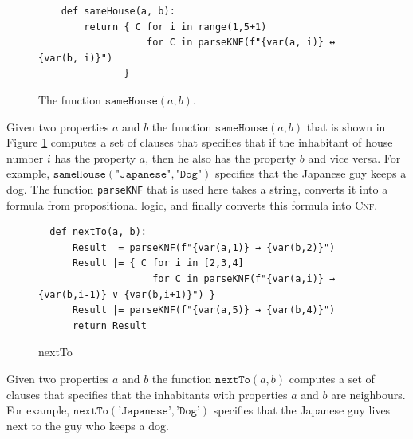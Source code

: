 \begin{figure}[!ht]
\centering
\begin{verbatim}
    def sameHouse(a, b):
        return { C for i in range(1,5+1)
                   for C in parseKNF(f"{var(a, i)} ↔ {var(b, i)}") 
               }
\end{verbatim}
\vspace*{-0.3cm}
\caption{The function $\texttt{sameHouse}(a, b)$.}
\label{fig:sameHouse}
\end{figure}

Given two properties $a$ and $b$ the function $\texttt{sameHouse}(a, b)$ that is
shown in Figure \ref{fig:sameHouse} computes
a set of clauses that specifies that if the inhabitant of house number $i$ has
the property $a$, then he also has the property $b$ and vice versa.  For
example, $\texttt{sameHouse}(\texttt{"Japanese"}, \texttt{"Dog"})$ specifies
that the Japanese guy keeps a dog.  The function \texttt{parseKNF} that is used here takes a string, converts
it into a formula from propositional logic, and finally converts this formula into \textsc{Cnf}.


\begin{figure}[!ht]
\centering
\begin{verbatim}
  def nextTo(a, b):
      Result  = parseKNF(f"{var(a,1)} → {var(b,2)}")
      Result |= { C for i in [2,3,4]
                    for C in parseKNF(f"{var(a,i)} → {var(b,i-1)} ∨ {var(b,i+1)}") }
      Result |= parseKNF(f"{var(a,5)} → {var(b,4)}")
      return Result
\end{verbatim}
\vspace*{-0.3cm}
\caption{nextTo}
\label{fig:nextTo}
\end{figure}
Given two properties $a$ and $b$ the function $\texttt{nextTo}(a, b)$ computes a
set of clauses that specifies that the inhabitants with properties $a$ and $b$
are neighbours.  For example, $\texttt{nextTo}(\texttt{'Japanese'}, \texttt{'Dog'})$
specifies that the Japanese guy lives next to the guy who keeps a dog. 


